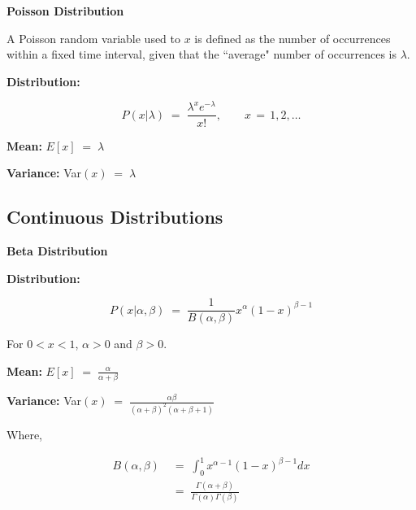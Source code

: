 \documentclass[10pt]{article}
\numberwithin{equation}{section}
\begin{document}
 
  \vspace{3mm}
 
 \noindent
\textbf{Poisson Distribution}

\noindent
A Poisson random variable used to $x$ is defined as the number of occurrences within a fixed time interval, given that the ``average" number of occurrences is $\lambda$.

\vspace{1mm}

 \noindent
 \textbf{Distribution:}  
 
 \begin{equation}
 P(x | \lambda)  \; = \;  \frac{\lambda^{x} e^{-\lambda}}{x!}, \qquad x \, = \, 1,2, \ldots
 \end{equation}
 
 
 \vspace{1mm} 

\noindent
\textbf{Mean:} $E[x] \; = \;  \lambda  $
 
\noindent
\textbf{Variance:}  Var$(x) \; = \;  \lambda $

 
\subsection{Continuous Distributions}


 

 \noindent
\textbf{Beta Distribution}

\vspace{1mm}

 \noindent
 \textbf{Distribution:}  
 
 \begin{equation}
 P(x | \alpha, \beta )  \; = \;  \frac{1}{B(\alpha, \beta)} x^{\alpha} (1-x)^{\beta -1}
 \end{equation}
 
 \noindent
 For $ 0 < x < 1$, $\alpha > 0$ and $\beta > 0$.
 
 \vspace{1mm} 

\noindent
\textbf{Mean:} $E[x] \; = \;  \frac{\alpha}{\alpha + \beta} $
 
\noindent
\textbf{Variance:}  Var$(x) \; = \;  \frac{\alpha \beta}{(\alpha + \beta)^{2} ( \alpha + \beta + 1)} $

\noindent
Where,

\begin{align}
B(\alpha, \beta) \; &= \; \int_{0}^{1} x^{\alpha-1} (1-x)^{\beta -1 } dx  \\
&= \; \frac{\Gamma(\alpha + \beta)}{\Gamma(\alpha) \Gamma(\beta)}
\end{align}
\end{document}
